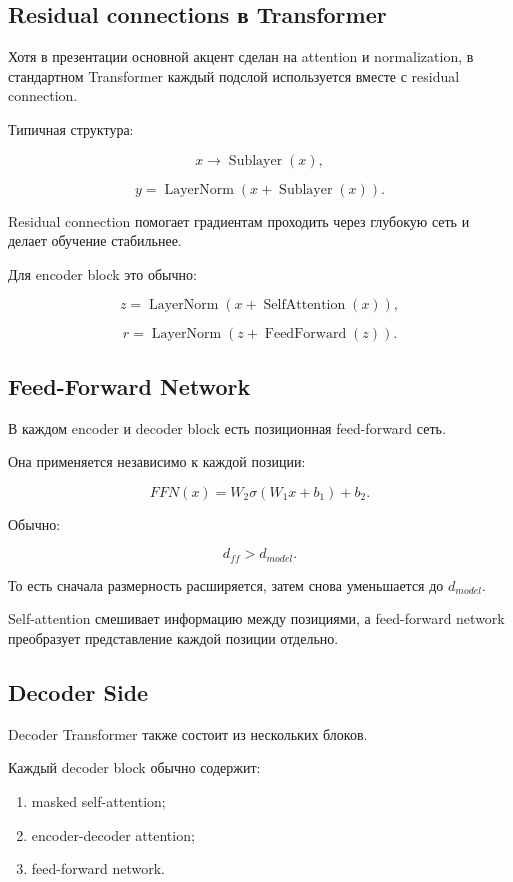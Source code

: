 \documentclass[a4paper,12pt]{article}
\begin{document}
\subsection{Residual connections в Transformer}

Хотя в презентации основной акцент сделан на attention и normalization, в стандартном Transformer каждый подслой используется вместе с residual connection.

Типичная структура:

\[
x \rightarrow \operatorname{Sublayer}(x),
\]

\[
y = \operatorname{LayerNorm}(x + \operatorname{Sublayer}(x)).
\]

Residual connection помогает градиентам проходить через глубокую сеть и делает обучение стабильнее.

Для encoder block это обычно:

\[
z = \operatorname{LayerNorm}(x + \operatorname{SelfAttention}(x)),
\]

\[
r = \operatorname{LayerNorm}(z + \operatorname{FeedForward}(z)).
\]

\subsection{Feed-Forward Network}

В каждом encoder и decoder block есть позиционная feed-forward сеть.

Она применяется независимо к каждой позиции:

\[
FFN(x) = W_2 \sigma(W_1 x + b_1) + b_2.
\]

Обычно:

\[
d_{ff} > d_{model}.
\]

То есть сначала размерность расширяется, затем снова уменьшается до \(d_{model}\).

Self-attention смешивает информацию между позициями, а feed-forward network преобразует представление каждой позиции отдельно.

\subsection{Decoder Side}

Decoder Transformer также состоит из нескольких блоков.

Каждый decoder block обычно содержит:

\begin{enumerate}
    \item masked self-attention;
    \item encoder-decoder attention;
    \item feed-forward network.
\end{enumerate}
\end{document}
